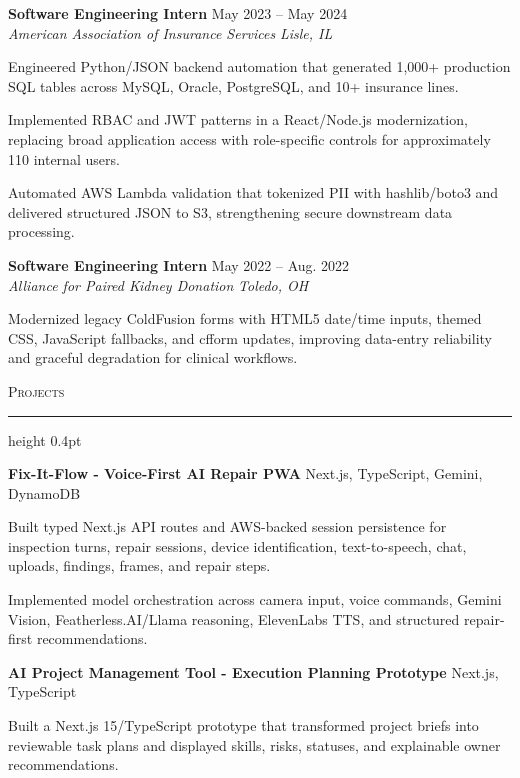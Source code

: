 \documentclass[letterpaper,11pt]{article}
\newcommand{\resumesection}[1]{%
  \par\vspace{2pt}%
  {\large\scshape #1}\par\vspace{2pt}%
  \hrule height 0.4pt\vspace{2pt}%
}
\newcommand{\resumeSubheading}[4]{
  \textbf{#1} \hfill #2\\
  \textit{#3} \hfill \textit{#4}
}
\newcommand{\projectHeading}[2]{
  \textbf{#1} \hfill #2
}
\begin{document}
\resumeSubheading
{Software Engineering Intern}{May 2023 -- May 2024}
{American Association of Insurance Services}{Lisle, IL}
\begin{tightitemize}
  \item Engineered Python/JSON backend automation that generated 1,000+ production SQL tables across MySQL, Oracle, PostgreSQL, and 10+ insurance lines.
  \item Implemented RBAC and JWT patterns in a React/Node.js modernization, replacing broad application access with role-specific controls for approximately 110 internal users.
  \item Automated AWS Lambda validation that tokenized PII with hashlib/boto3 and delivered structured JSON to S3, strengthening secure downstream data processing.
\end{tightitemize}

\resumeSubheading
{Software Engineering Intern}{May 2022 -- Aug. 2022}
{Alliance for Paired Kidney Donation}{Toledo, OH}
\begin{tightitemize}
  \item Modernized legacy ColdFusion forms with HTML5 date/time inputs, themed CSS, JavaScript fallbacks, and cfform updates, improving data-entry reliability and graceful degradation for clinical workflows.
\end{tightitemize}

\resumesection{Projects}
\projectHeading{Fix-It-Flow - Voice-First AI Repair PWA}{Next.js, TypeScript, Gemini, DynamoDB}
\begin{tightitemize}
  \item Built typed Next.js API routes and AWS-backed session persistence for inspection turns, repair sessions, device identification, text-to-speech, chat, uploads, findings, frames, and repair steps.
  \item Implemented model orchestration across camera input, voice commands, Gemini Vision, Featherless.AI/Llama reasoning, ElevenLabs TTS, and structured repair-first recommendations.
\end{tightitemize}

\projectHeading{AI Project Management Tool - Execution Planning Prototype}{Next.js, TypeScript}
\begin{tightitemize}
  \item Built a Next.js 15/TypeScript prototype that transformed project briefs into reviewable task plans and displayed skills, risks, statuses, and explainable owner recommendations.
\end{tightitemize}
\end{document}
